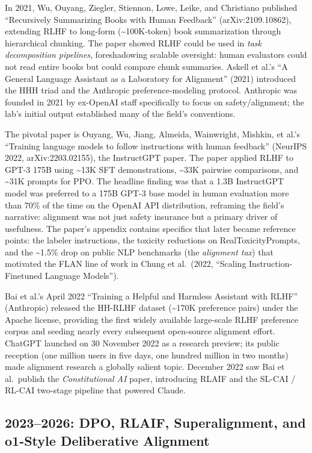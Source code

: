 In 2021, Wu, Ouyang, Ziegler, Stiennon, Lowe, Leike, and Christiano published ``Recursively Summarizing Books with Human Feedback'' (arXiv:2109.10862), extending RLHF to long-form (\textasciitilde100K-token) book summarization through hierarchical chunking. The paper showed RLHF could be used in \emph{task decomposition pipelines}, foreshadowing scalable oversight: human evaluators could not read entire books but could compare chunk summaries. Askell et al.'s ``A General Language Assistant as a Laboratory for Alignment'' (2021) introduced the HHH triad and the Anthropic preference-modeling protocol. Anthropic was founded in 2021 by ex-OpenAI staff specifically to focus on safety/alignment; the lab's initial output established many of the field's conventions.

The pivotal paper is Ouyang, Wu, Jiang, Almeida, Wainwright, Mishkin, et al.'s ``Training language models to follow instructions with human feedback'' (NeurIPS 2022, arXiv:2203.02155), the InstructGPT paper. The paper applied RLHF to GPT-3 175B using \textasciitilde13K SFT demonstrations, \textasciitilde33K pairwise comparisons, and \textasciitilde31K prompts for PPO. The headline finding was that a 1.3B InstructGPT model was preferred to a 175B GPT-3 base model in human evaluation more than 70\% of the time on the OpenAI API distribution, reframing the field's narrative: alignment was not just safety insurance but a primary driver of usefulness. The paper's appendix contains specifics that later became reference points: the labeler instructions, the toxicity reductions on RealToxicityPrompts, and the \textasciitilde1.5\% drop on public NLP benchmarks (the \emph{alignment tax}) that motivated the FLAN line of work in Chung et al.~(2022, ``Scaling Instruction-Finetuned Language Models'').

Bai et al.'s April 2022 ``Training a Helpful and Harmless Assistant with RLHF'' (Anthropic) released the HH-RLHF dataset (\textasciitilde170K preference pairs) under the Apache license, providing the first widely available large-scale RLHF preference corpus and seeding nearly every subsequent open-source alignment effort. ChatGPT launched on 30 November 2022 as a research preview; its public reception (one million users in five days, one hundred million in two months) made alignment research a globally salient topic. December 2022 saw Bai et al.~publish the \emph{Constitutional AI} paper, introducing RLAIF and the SL-CAI / RL-CAI two-stage pipeline that powered Claude.

\subsection{2023--2026: DPO, RLAIF, Superalignment, and o1-Style Deliberative Alignment}\label{dpo-rlaif-superalignment-and-o1-style-deliberative-alignment}

